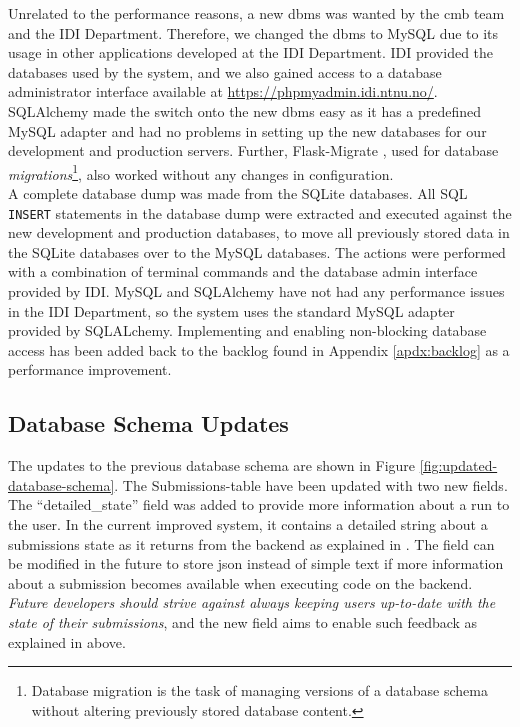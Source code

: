 Unrelated to the performance reasons, a new \gls{dbms} was wanted by the \gls{cmb} team and the IDI Department. Therefore, we changed the \gls{dbms} to MySQL due to its usage in other applications developed at the IDI Department. IDI provided the databases used by the system, and we also gained access to a database administrator interface available at \url{https://phpmyadmin.idi.ntnu.no/}. SQLAlchemy made the switch onto the new \gls{dbms} easy as it has a predefined MySQL adapter and had no problems in setting up the new databases for our development and production servers. Further, Flask-Migrate \cite{FLASKMIGRATE}, used for database \textit{migrations}\footnote{Database migration is the task of managing versions of a database schema without altering previously stored database content.}, also worked without any changes in configuration. \\

A complete database dump was made from the SQLite databases. All SQL \texttt{INSERT} statements in the database dump were extracted and executed against the new development and production databases, to move all previously stored data in the SQLite databases over to the MySQL databases. The actions were performed with a combination of terminal commands and the database admin interface provided by IDI. MySQL and SQLAlchemy have not had any performance issues in the IDI Department, so the system uses the standard MySQL adapter provided by SQLALchemy. Implementing and enabling non-blocking database access has been added back to the backlog found in Appendix \ref{apdx:backlog} as a performance improvement.

\subsection{Database Schema Updates}
\label{subsec:impr-database}
The updates to the previous database schema are shown in Figure \ref{fig:updated-database-schema}. The Submissions-table have been updated with two new fields. The ``detailed\_state'' field was added to provide more information about a run to the user. In the current improved system, it contains a detailed string about a submissions state as it returns from the backend as explained in . The field can be modified in the future to store \gls{json} instead of simple text if more information about a submission becomes available when executing code on the backend. \textit{Future developers should strive against always keeping users up-to-date with the state of their submissions}, and the new field aims to enable such feedback as explained in  above. \\

